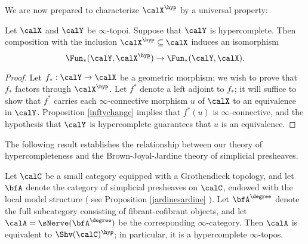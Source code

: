 We are now prepared to characterize $\calX^{\hyp}$ by a universal property:

\begin{proposition}
Let $\calX$ and $\calY$ be $\infty$-topoi. Suppose that $\calY$ is hypercomplete.
Then composition with the inclusion $\calX^{\hyp} \subseteq \calX$ induces an isomorphism
$$ \Fun_{\ast}(\calY, \calX^{\hyp} ) \rightarrow \Fun_{\ast}(\calY, \calX).$$
\end{proposition}

\begin{proof}
Let $f_{\ast}: \calY \rightarrow \calX$ be a geometric morphism; we wish to prove that
$f_{\ast}$ factors through $\calX^{\hyp}$. Let $f^{\ast}$ denote a left adjoint to $f_{\ast}$; it will suffice to show that $f^{\ast}$ carries each $\infty$-connective morphism $u$ of
$\calX$ to an equivalence in $\calY$. Proposition \ref{inftychange} implies that
$f^{\ast}(u)$ is $\infty$-connective, and the hypothesis that $\calY$ is hypercomplete guarantees that $u$ is an equivalence.
\end{proof}

The following result establishes the relationship between our theory of hypercompleteness
and the Brown-Joyal-Jardine theory of simplicial presheaves.

\begin{proposition}\label{suga}
Let $\calC$ be a small category equipped with a Grothendieck topology, and let $\bfA$
denote the category of simplicial presheaves on $\calC$, endowed with the local model structure $($ see Proposition \ref{jardinesardine} $)$.
Let $\bfA^{\degree}$ denote the full subcategory consisting of fibrant-cofibrant objects, and let
$\calA = \sNerve( \bfA^{\degree} )$ be the corresponding $\infty$-category. Then $\calA$
is equivalent to $\Shv(\calC)^{\hyp}$; in particular, it is a hypercomplete $\infty$-topos.
\end{proposition}

